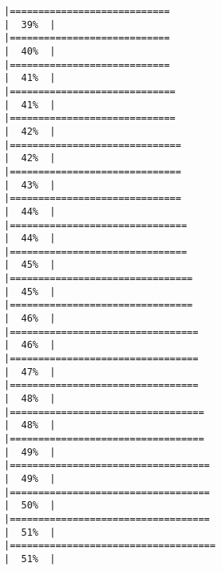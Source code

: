 \documentclass[
]{article}
\begin{document}
\begin{verbatim}
|============================                                          |  39%  |                                                                              |============================                                          |  40%  |                                                                              |============================                                          |  41%  |                                                                              |=============================                                         |  41%  |                                                                              |=============================                                         |  42%  |                                                                              |==============================                                        |  42%  |                                                                              |==============================                                        |  43%  |                                                                              |==============================                                        |  44%  |                                                                              |===============================                                       |  44%  |                                                                              |===============================                                       |  45%  |                                                                              |================================                                      |  45%  |                                                                              |================================                                      |  46%  |                                                                              |=================================                                     |  46%  |                                                                              |=================================                                     |  47%  |                                                                              |=================================                                     |  48%  |                                                                              |==================================                                    |  48%  |                                                                              |==================================                                    |  49%  |                                                                              |===================================                                   |  49%  |                                                                              |===================================                                   |  50%  |                                                                              |===================================                                   |  51%  |                                                                              |====================================                                  |  51%  |                                                                              
\end{verbatim}
\end{document}
